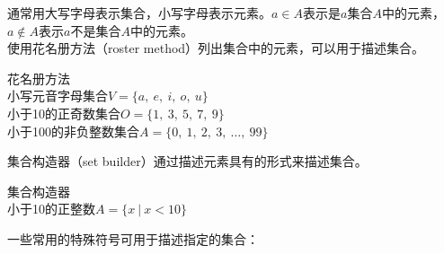 \documentclass[12pt, openany, oneside]{book}
\begin{document}
通常用大写字母表示集合，小写字母表示元素。$ a \in A $表示是$ a $集合$ A $中的元素，$ a \notin A $表示$ a $不是集合$ A $中的元素。\\

使用花名册方法（roster method）列出集合中的元素，可以用于描述集合。

\begin{tcolorbox}
	花名册方法\\
	小写元音字母集合$ V = \{a,\ e,\ i,\ o,\ u\} $\\
	小于10的正奇数集合$ O = \{1,\ 3,\ 5,\ 7,\ 9\} $\\
	小于100的非负整数集合$ A = \{0,\ 1,\ 2,\ 3,\ \dots,\ 99\} $
\end{tcolorbox}

集合构造器（set builder）通过描述元素具有的形式来描述集合。

\begin{tcolorbox}
	集合构造器\\
	小于10的正整数$ A = \{x\ |\ x < 10\} $
\end{tcolorbox}

一些常用的特殊符号可用于描述指定的集合：

\begin{table}[H]
	\centering
\end{table}
\end{document}
